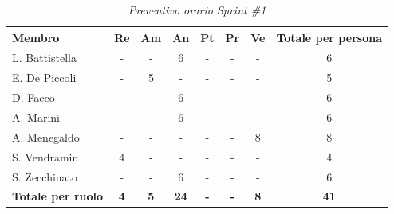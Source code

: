 \documentclass[a4paper, 10pt, colorlinks=true, linkcolor=black, urlcolor=blue, citecolor=blue, hidelinks]{article}
\renewcommand{\arraystretch}{1.2}
\begin{document}
\begin{table}[H]
    \centering
    \renewcommand{\arraystretch}{1.4}
    \begin{tabular}{|l|c|c|c|c|c|c|c|}
        \hline
        \rowcolor{bluBitless!15}
        \textbf{Membro} & \textbf{Re} & \textbf{Am} & \textbf{An} & \textbf{Pt} & \textbf{Pr} & \textbf{Ve} & \textbf{Totale per persona} \\
        \hline
        L. Battistella & - & - & 6 & - & - & - & 6 \\ \hline
        E. De Piccoli & - & 5 & - & - & - & - & 5 \\ \hline
        D. Facco & - & - & 6 & - & - & - & 6 \\ \hline
        A. Marini & - & - & 6 & - & - & - & 6 \\ \hline
        A. Menegaldo & - & - & - & - & - & 8 & 8 \\ \hline
        S. Vendramin & 4 & - & - & - & - & - & 4 \\ \hline
        S. Zecchinato & - & - & 6 & - & - & - & 6 \\ \hline
        \rowcolor{bluBitless!8}
        \textbf{Totale per ruolo} & \textbf{4} & \textbf{5} & \textbf{24} & \textbf{-} & \textbf{-} & \textbf{8} & \textbf{41} \\
        \hline
    \end{tabular}
    \caption{\textit{Preventivo orario Sprint \#1}}
\end{table}
\end{document}
